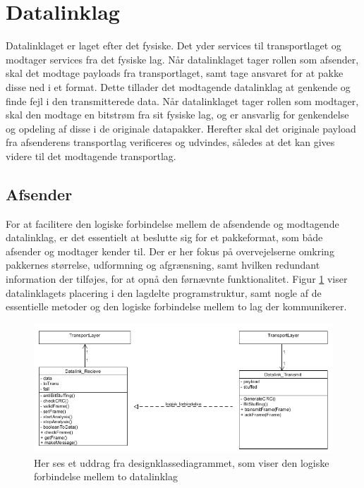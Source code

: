 \section{Datalinklag}
Datalinklaget er laget efter det fysiske. Det yder services til transportlaget og modtager services fra det fysiske lag.
Når datalinklaget tager rollen som afsender, skal det modtage payloads fra transportlaget, samt tage ansvaret for at pakke disse ned i et format.
Dette tillader det modtagende datalinklag at genkende og finde fejl i den transmitterede data.
Når datalinklaget tager rollen som modtager, skal den modtage en bitstrøm fra sit fysiske lag, og er ansvarlig for genkendelse og opdeling af disse i de originale datapakker.
Herefter skal det originale payload fra afsenderens transportlag verificeres og udvindes, således at det kan gives videre til det modtagende transportlag.

\subsection{Afsender}
For at facilitere den logiske forbindelse mellem de afsendende og modtagende datalinklag, er det essentielt at beslutte sig for et pakkeformat, som både afsender og modtager kender til. Der er her fokus på overvejelserne omkring pakkernes størrelse, udformning og afgrænsning, samt hvilken redundant information der tilføjes, for at opnå den førnævnte funktionalitet. Figur \ref{fig:DataLinkLogical} viser datalinklagets placering i den lagdelte programstruktur, samt nogle af de essentielle metoder og den logiske forbindelse mellem to lag der kommunikerer.

\begin{figure}[h!]
\centering
\includegraphics[scale=0.7]{Billeder/DataLinkLogical.PNG}
\caption{Her ses et uddrag fra designklassediagrammet, som viser den logiske forbindelse mellem to datalinklag}
\label{fig:DataLinkLogical}
\end{figure}

